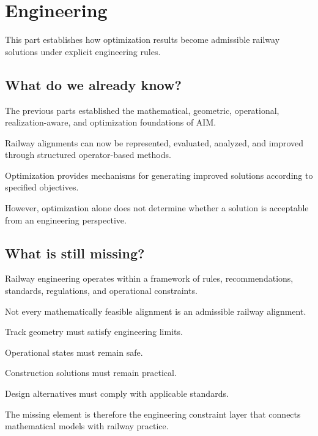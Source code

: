 
\chapter*{Engineering}
{}

This part establishes how optimization results become admissible railway
solutions under explicit engineering rules.

\section*{What do we already know?}

The previous parts established the mathematical, geometric,
operational, realization-aware, and optimization foundations of AIM.

Railway alignments can now be represented, evaluated, analyzed, and
improved through structured operator-based methods.

Optimization provides mechanisms for generating improved solutions
according to specified objectives.

However, optimization alone does not determine whether a solution is
acceptable from an engineering perspective.

\section*{What is still missing?}

Railway engineering operates within a framework of rules,
recommendations, standards, regulations, and operational constraints.

Not every mathematically feasible alignment is an admissible railway
alignment.

Track geometry must satisfy engineering limits.

Operational states must remain safe.

Construction solutions must remain practical.

Design alternatives must comply with applicable standards.

The missing element is therefore the engineering constraint layer that
connects mathematical models with railway practice.

